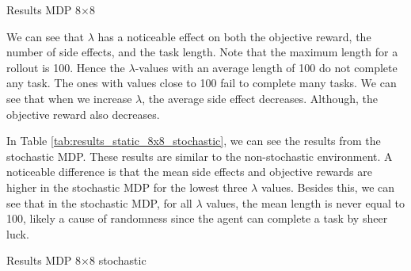 \documentclass[12pt,A4]{report}
\theoremstyle{definition}
\begin{document}
\begin{table}[H]
  \centering
  \caption{Results MDP 8$\times$8}
  
  \label{tab:results_static_8x8}
\end{table}

We can see that $\lambda$ has a noticeable effect on both the objective reward, the number of side effects, and the task length. Note that the maximum length for a rollout is 100. Hence the $\lambda$-values with an average length of 100 do not complete any task. The ones with values close to 100 fail to complete many tasks. We can see that when we increase $\lambda$, the average side effect decreases. Although, the objective reward also decreases. 

In Table \ref{tab:results_static_8x8_stochastic}, we can see the results from the stochastic MDP. These results are similar to the non-stochastic environment. A noticeable difference is that the mean side effects and objective rewards are higher in the stochastic MDP for the lowest three $\lambda$ values. Besides this, we can see that in the stochastic MDP, for all $\lambda$ values, the mean length is never equal to 100, likely a cause of randomness since the agent can complete a task by sheer luck.



\begin{table}[H]
  \centering
  \caption{Results MDP 8$\times$8 stochastic}
  
  \label{tab:results_static_8x8_stochastic}
\end{table}


\end{document}
